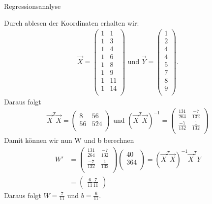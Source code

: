 \begin{task}[credit=7]{Regressionsanalyse}
\begin{subtask}[title=Parameterbestimmung,points=2]
\begin{solution}
Durch ablesen der Koordinaten erhalten wir: 
\begin{align*}
\vec{X} = 
\begin{pmatrix}
1 & 1 \\
1 & 3 \\
1 & 4 \\
1 & 6 \\
1 & 8 \\
1 & 9 \\
1 & 11 \\
1 & 14 \\
\end{pmatrix}
\text{ und }
\vec{Y} = 
\begin{pmatrix}
1 \\
2 \\
4 \\
4 \\ 
5 \\
7 \\
8 \\ 
9 \\
\end{pmatrix}.
\end{align*}
Daraus folgt
\begin{align*}
\vec{X}^T \vec{X} = 
\begin{pmatrix}
8 & 56 \\
56 & 524 \\
\end{pmatrix}
\text{ und }
(\vec{X}^T \vec{X})^{-1} = 
\begin{pmatrix}
\frac{131}{264} & \frac{-7}{132} \\
\frac{-7}{132} & \frac{1}{132} \\
\end{pmatrix}
\end{align*}
Damit können wir nun W und b berechnen
\begin{align*}
W' &= 
\begin{pmatrix}
\frac{131}{264} & \frac{-7}{132} \\
\frac{-7}{132} & \frac{1}{132} \\
\end{pmatrix}
\begin{pmatrix}
40 \\
364 \\
\end{pmatrix} 
= (\vec{X}^T \vec{X})^{-1} \vec{X}^T Y \\
&= 
\begin{pmatrix}
\frac{6}{11}
\frac{7}{11}
\end{pmatrix}
\end{align*}
Daraus folgt $W= \frac{7}{11}$ und $b = \frac{6}{11}$.
\end{solution}

\end{subtask}
\end{task}
